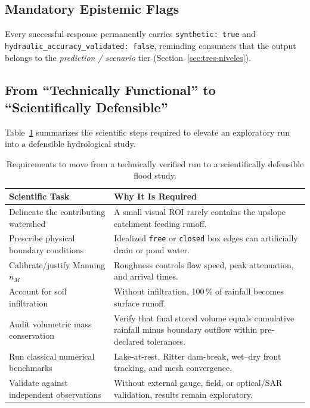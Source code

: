 \documentclass[11pt,a4paper]{article}
\begin{document}
\subsection{Mandatory Epistemic Flags}

Every successful response permanently carries \texttt{synthetic: true} and \texttt{hydraulic\_accuracy\_validated: false}, reminding consumers that the output belongs to the \emph{prediction / scenario} tier (Section~\ref{sec:tres-niveles}).

\subsection{From ``Technically Functional'' to ``Scientifically Defensible''}

Table~\ref{tab:de-tecnico-a-cientifico} summarizes the scientific steps required to elevate an exploratory run into a defensible hydrological study.

\begin{table}[htbp]
\centering\small
\begin{tabularx}{\linewidth}{p{.27\linewidth}X}
\toprule
\textbf{Scientific Task} & \textbf{Why It Is Required}\\\midrule
Delineate the contributing watershed & A small visual ROI rarely contains the upslope catchment feeding runoff.\\
Prescribe physical boundary conditions & Idealized \texttt{free} or \texttt{closed} box edges can artificially drain or pond water.\\
Calibrate/justify Manning $n_M$ & Roughness controls flow speed, peak attenuation, and arrival times.\\
Account for soil infiltration & Without infiltration, 100\,\% of rainfall becomes surface runoff.\\
Audit volumetric mass conservation & Verify that final stored volume equals cumulative rainfall minus boundary outflow within pre-declared tolerances.\\
Run classical numerical benchmarks & Lake-at-rest, Ritter dam-break, wet--dry front tracking, and mesh convergence.\\
Validate against independent observations & Without external gauge, field, or optical/SAR validation, results remain exploratory.\\\bottomrule
\end{tabularx}
\caption{Requirements to move from a technically verified run to a scientifically defensible flood study.}
\label{tab:de-tecnico-a-cientifico}
\end{table}
\end{document}
